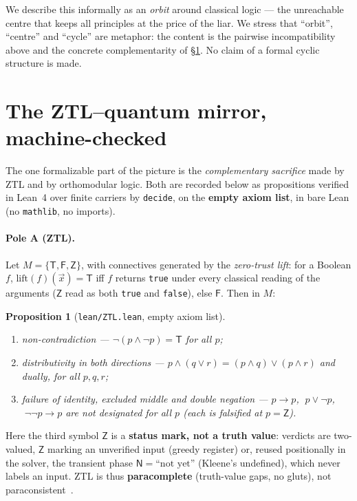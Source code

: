 \documentclass[11pt]{article}
\newtheorem{prop}[lem]{Proposition}
\theoremstyle{remark}
\newcommand{\T}{\mathsf{T}}
\newcommand{\F}{\mathsf{F}}
\newcommand{\Zmark}{\mathsf{Z}}
\newcommand{\Nph}{\mathsf{N}}
\begin{document}
We describe this informally as an \emph{orbit} around classical logic --- the
unreachable centre that keeps all principles at the price of the liar. We
stress that ``orbit'', ``centre'' and ``cycle'' are metaphor: the content is
the pairwise incompatibility above and the concrete complementarity of
\S\ref{sec:mirror}. No claim of a formal cyclic structure is made.

\section{The ZTL--quantum mirror, machine-checked}\label{sec:mirror}

The one formalizable part of the picture is the \emph{complementary sacrifice}
made by ZTL and by orthomodular logic. Both are recorded below as
propositions verified in Lean~4 over finite carriers by \texttt{decide}, on
the \textbf{empty axiom list}, in bare Lean (no \texttt{mathlib}, no imports).

\paragraph{Pole A (ZTL).} Let $M = \{\T, \F, \Zmark\}$, with connectives
generated by the \emph{zero-trust lift}: for a Boolean $f$,
$\mathrm{lift}(f)(\vec{x}) = \T$ iff $f$ returns \texttt{true} under every
classical reading of the arguments ($\Zmark$ read as both \texttt{true} and
\texttt{false}), else $\F$. Then in $M$:

\begin{prop}[\texttt{lean/ZTL.lean}, empty axiom list]\label{propA}
\leavevmode
\begin{enumerate}
\item[(i)] \emph{non-contradiction} --- $\neg(p \wedge \neg p) = \T$ for all $p$;
\item[(ii)] \emph{distributivity in both directions} ---
$p \wedge (q \vee r) = (p\wedge q) \vee (p\wedge r)$ and dually, for all $p,q,r$;
\item[(iii)] \emph{failure of identity, excluded middle and double negation} ---
$p \to p$, $\;p \vee \neg p$, $\;\neg\neg p \to p$ are not designated for all
$p$ (each is falsified at $p = \Zmark$).
\end{enumerate}
\end{prop}

Here the third symbol $\Zmark$ is a \textbf{status mark, not a truth value}:
verdicts are two-valued, $\Zmark$ marking an unverified input (greedy
register) or, reused positionally in the solver, the transient phase
$\Nph = \text{``not yet''}$ (Kleene's undefined), which never labels an input.
ZTL is thus \textbf{paracomplete} (truth-value gaps, no gluts), not
paraconsistent~\cite{ztl}.
\end{document}
